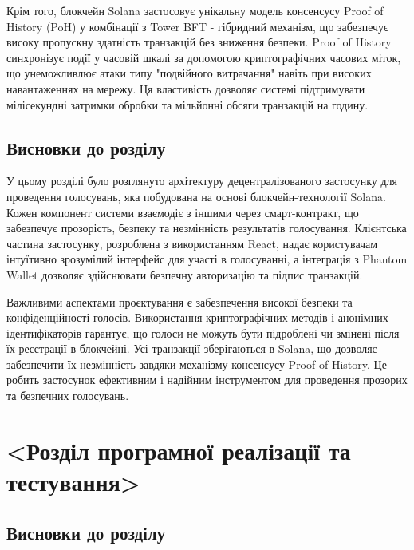 \documentclass[14pt]{extreport}
\begin{document}
  Крім того, блокчейн Solana застосовує унікальну модель консенсусу Proof of History (PoH) у комбінації з Tower BFT - гібридний механізм, що забезпечує високу пропускну здатність транзакцій без зниження безпеки. Proof of History синхронізує події у часовій шкалі за допомогою криптографічних часових міток, що унеможливлює атаки типу "подвійного витрачання" навіть при високих навантаженнях на мережу. Ця властивість дозволяє системі підтримувати мілісекундні затримки обробки та мільйонні обсяги транзакцій на годину.
  
  \section{Висновки до розділу}
  
  У цьому розділі було розглянуто архітектуру децентралізованого застосунку для проведення голосувань, яка побудована на основі блокчейн-технології Solana. Кожен компонент системи взаємодіє з іншими через смарт-контракт, що забезпечує прозорість, безпеку та незмінність результатів голосування. Клієнтська частина застосунку, розроблена з використанням React, надає користувачам інтуїтивно зрозумілий інтерфейс для участі в голосуванні, а інтеграція з Phantom Wallet дозволяє здійснювати безпечну авторизацію та підпис транзакцій.

  Важливими аспектами проєктування є забезпечення високої безпеки та конфіденційності голосів. Використання криптографічних методів і анонімних ідентифікаторів гарантує, що голоси не можуть бути підроблені чи змінені після їх реєстрації в блокчейні. Усі транзакції зберігаються в Solana, що дозволяє забезпечити їх незмінність завдяки механізму консенсусу Proof of History. Це робить застосунок ефективним і надійним інструментом для проведення прозорих та безпечних голосувань.
  
  \chapter{<Розділ програмної реалізації та тестування>}
  
  \section{}
  \section{Висновки до розділу}
  
\end{document}
